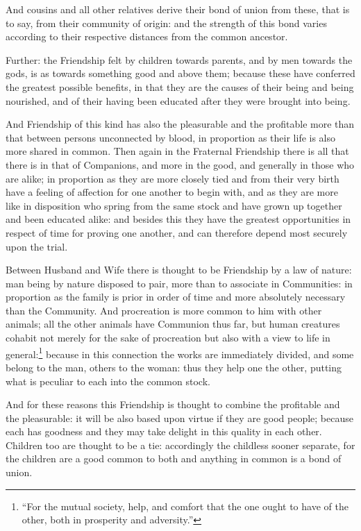 And cousins and all other relatives derive their bond of union from these, that
is to say, from their community of origin: and the strength of this bond varies
according to their respective distances from the common ancestor.

Further: the Friendship felt by children towards parents, and by men towards
the gods, is as towards something good and above them; because these have
conferred the greatest possible benefits, in that they are the causes of their
being and being nourished, and of their having been educated after they were
brought into being.

And Friendship of this kind has also the pleasurable and the profitable more
than that between persons unconnected by blood, in proportion as their life is
also more shared in common. Then again in the Fraternal Friendship there is all
that there is in that of Companions, and more in the good, and generally in
those who are alike; in proportion as they are more closely tied and from their
very birth have a feeling of affection for one another to begin with, and as
they are more like in disposition who spring from the same stock and have grown
up together and been educated alike: and besides this they have the greatest
opportunities in respect of time for proving one another, and can therefore
depend most securely upon the trial.

Between Husband and Wife there is thought to be Friendship by a law of nature:
man being by nature disposed to pair, more than to associate in Communities: in
proportion as the family is prior in order of time and more absolutely
necessary than the Community. And procreation is more common to him with other
animals; all the other animals have Communion thus far, but human creatures
cohabit not merely for the sake of procreation but also with a view to life in
general:\footnote{“For the mutual society, help, and comfort that the one ought to have of
the other, both in prosperity and adversity.”}
because in this connection the works are immediately divided, and some belong
to the man, others to the woman: thus they help one the other, putting what is
peculiar to each into the common stock.

And for these reasons this Friendship is thought to combine the profitable and
the pleasurable: it will be also based upon virtue if they are good people;
because each has goodness and they may take delight in this quality in each
other. Children too are thought to be a tie: accordingly the childless sooner
separate, for the children are a good common to both and anything in common is
a bond of union.


